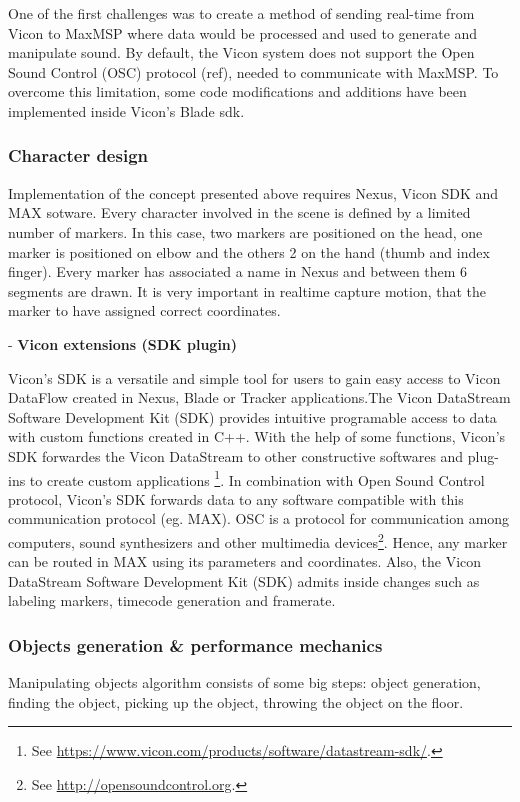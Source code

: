 \documentclass{nime-alternate}
\begin{document}
One of the first challenges was to create a method of sending real-time from Vicon to MaxMSP where data would be processed and used to generate and manipulate sound. By default, the Vicon system does not support the Open Sound Control (OSC) protocol (ref), needed to communicate with MaxMSP. To overcome this limitation, some code modifications and additions have been implemented inside Vicon’s Blade sdk.


\subsubsection{Character design}

Implementation of the concept presented above requires Nexus, Vicon SDK and MAX sotware. Every character involved in the scene is defined by a limited number of markers. In this case, two markers are positioned on the head, one marker is positioned on elbow and the others 2 on the hand (thumb and index finger). Every marker has associated a name in Nexus and between them 6 segments are drawn. It is very important in realtime capture motion, that the marker to have assigned correct coordinates.

- \textbf{Vicon extensions (SDK plugin)} \par
Vicon's SDK is a versatile and simple tool for users to gain easy access to Vicon DataFlow created in Nexus, Blade or Tracker applications.The Vicon DataStream Software Development Kit (SDK) provides intuitive programable access to data with custom functions created in C++. With the help of some functions, Vicon's SDK forwardes the Vicon DataStream to other constructive softwares and plug-ins to create custom applications \footnote{See \url{https://www.vicon.com/products/software/datastream-sdk/}.}. In combination with Open Sound Control protocol, Vicon's SDK forwards data to any software compatible with this communication protocol (eg. MAX). OSC is a protocol for communication among computers, sound synthesizers and other multimedia devices\footnote{See  \url{http://opensoundcontrol.org}.}. Hence, any marker can be routed in MAX using its parameters and coordinates. Also, the Vicon DataStream Software Development Kit (SDK) admits inside changes such as labeling markers, timecode generation and framerate.

\subsubsection{Objects generation \& performance mechanics}
Manipulating objects algorithm consists of some big steps: object generation, finding the object, picking up the object, throwing the object on the floor. 
\end{document}
